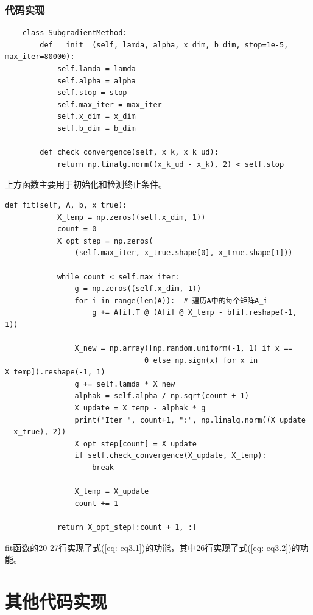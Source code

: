 \documentclass{article}
\begin{document}
\subsubsection{代码实现}
\begin{lstlisting}
    class SubgradientMethod:
        def __init__(self, lamda, alpha, x_dim, b_dim, stop=1e-5, max_iter=80000):
            self.lamda = lamda
            self.alpha = alpha
            self.stop = stop
            self.max_iter = max_iter
            self.x_dim = x_dim
            self.b_dim = b_dim

        def check_convergence(self, x_k, x_k_ud):
            return np.linalg.norm((x_k_ud - x_k), 2) < self.stop
\end{lstlisting}
上方函数主要用于初始化和检测终止条件。
\newpage
\begin{lstlisting}[firstnumber=12]
        def fit(self, A, b, x_true):
            X_temp = np.zeros((self.x_dim, 1))
            count = 0
            X_opt_step = np.zeros(
                (self.max_iter, x_true.shape[0], x_true.shape[1]))

            while count < self.max_iter:
                g = np.zeros((self.x_dim, 1))
                for i in range(len(A)):  # 遍历A中的每个矩阵A_i
                    g += A[i].T @ (A[i] @ X_temp - b[i].reshape(-1, 1))

                X_new = np.array([np.random.uniform(-1, 1) if x ==
                                0 else np.sign(x) for x in X_temp]).reshape(-1, 1)
                g += self.lamda * X_new
                alphak = self.alpha / np.sqrt(count + 1)
                X_update = X_temp - alphak * g
                print("Iter ", count+1, ":", np.linalg.norm((X_update - x_true), 2))
                X_opt_step[count] = X_update
                if self.check_convergence(X_update, X_temp):
                    break

                X_temp = X_update
                count += 1

            return X_opt_step[:count + 1, :]
\end{lstlisting}
fit函数的20-27行实现了式(\ref{eq: eq3.1})的功能，其中26行实现了式(\ref{eq: eq3.2})的功能。 \newpage
\section{其他代码实现}
\end{document}
